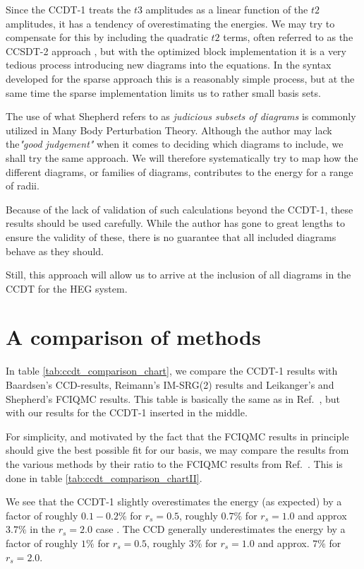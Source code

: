 Since the CCDT-1 treats the $t3$ amplitudes as a linear function of the $t2$ amplitudes, it has a tendency of overestimating the energies. \cite[p.320]{ShavittBartlett2009} We may try to compensate for this by including the quadratic $t2$ terms, often referred to as the CCSDT-2 approach \cite[p.320]{ShavittBartlett2009}, but with the optimized block implementation it is a very tedious process introducing new diagrams into the equations. In the syntax developed for the sparse approach this is a reasonably simple process, but at the same time the sparse implementation limits us to rather small basis sets.

The use of what Shepherd refers to as \emph{judicious subsets of diagrams} \cite{Shepherd2014} is commonly utilized in Many Body Perturbation Theory. Although the author may lack the\emph{"good judgement"} when it comes to deciding which diagrams to include, we shall try the same approach. We will therefore systematically try to map how the different diagrams, or families of diagrams, contributes to the energy for a range of radii. 

Because of the lack of validation of such calculations beyond the CCDT-1, these results should be used carefully. While the author has gone to great lengths to ensure the validity of these, there is no guarantee that all included diagrams behave as they should.

Still, this approach will allow us to arrive at the inclusion of all diagrams in the CCDT for the HEG system. 


\section{A comparison of methods}

In table \ref{tab:ccdt_comparison_chart}, we compare the CCDT-1 results with Baardsen's \cite{Baardsen2014} CCD-results, Reimann's IM-SRG(2) results \cite{Reimann2013} and Leikanger's \cite{Leikanger2013} and Shepherd's \cite{Shepherd2012} FCIQMC results. This table is basically the same as in Ref.~\cite[p.104]{Baardsen2014}, but with our results for the CCDT-1 inserted in the middle.

For simplicity, and motivated by the fact that the FCIQMC results in principle should give the best possible fit for our basis, we may compare the results from the various methods by their ratio to the FCIQMC results from Ref.~\cite{Shepherd2012}. This is done in table \ref{tab:ccdt_comparison_chartII}.

We see that the CCDT-1 slightly overestimates the energy (as expected) by a factor of roughly $0.1-0.2 \%$ for $r_s = 0.5$, roughly $0.7 \%$ for $r_s = 1.0$ and approx $3.7 \%$ in the $r_s = 2.0$ case . The CCD generally underestimates the energy by a factor of roughly $1 \%$ for $r_s = 0.5$, roughly $3\%$ for $r_s = 1.0$ and approx. $7 \%$ for $r_s = 2.0$. 


